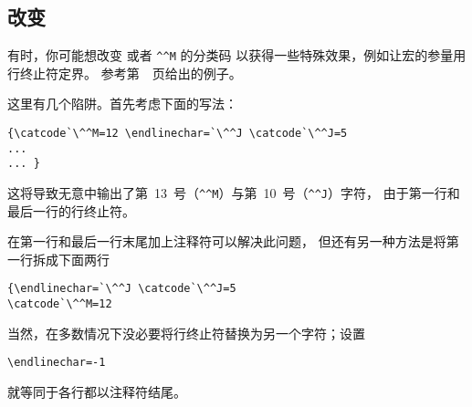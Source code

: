 \documentclass{book}
\begin{document}
\subsection{改变 }

有时，你可能想改变  或者 \verb.^^M. 的分类码%
以获得一些特殊效果，例如让宏的参量用行终止符定界。
参考第~\pageref{pick:eol}~页给出的例子。

这里有几个陷阱。首先考虑下面的写法：
\begin{verbatim}
{\catcode`\^^M=12 \endlinechar=`\^^J \catcode`\^^J=5
...
... }
\end{verbatim}
这将导致无意中输出了第~13~号（\verb-^^M-）与第~10~号（\verb-^^J-）字符，
由于第一行和最后一行的行终止符。

在第一行和最后一行末尾加上注释符可以解决此问题，
但还有另一种方法是将第一行拆成下面两行
\begin{verbatim}
{\endlinechar=`\^^J \catcode`\^^J=5
\catcode`\^^M=12
\end{verbatim}

当然，在多数情况下没必要将行终止符替换为另一个字符；设置
\begin{verbatim}
\endlinechar=-1
\end{verbatim}
就等同于各行都以注释符结尾。
\end{document}
